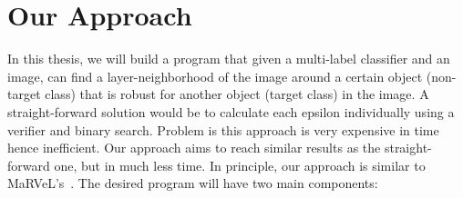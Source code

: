 
\section{Our Approach}

In this thesis, we will build a program that given a multi-label classifier and an image, can find a layer-neighborhood of the image around a certain object (non-target class) that is robust for another object (target class) in the image.
A straight-forward solution would be to calculate each epsilon individually using a verifier and binary search.
Problem is this approach is very expensive in time hence inefficient.
Our approach aims to reach similar results as the straight-forward one, but in much less time.
In principle, our approach is similar to MaRVeL's~\cite{MARVEL}.
The desired program will have two main components:

